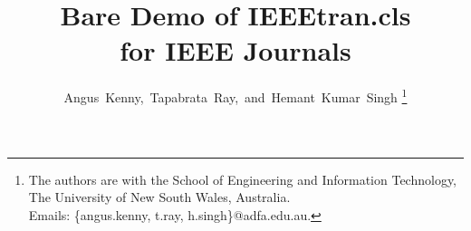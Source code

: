 \documentclass[journal]{IEEEtran}
\begin{document}
%
\title{Bare Demo of IEEEtran.cls\\ for IEEE Journals}
%
%
%


\author{Angus~Kenny,~Tapabrata~Ray,~and~Hemant~Kumar~Singh%
\thanks{The authors are with the School of Engineering and Information Technology, The University of New South Wales, Australia.\\Emails: \{angus.kenny, t.ray, h.singh\}@adfa.edu.au.}}

% 
%
\end{document}
